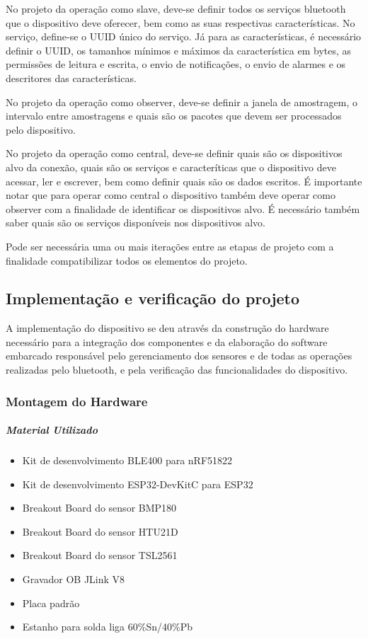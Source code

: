 No projeto da operação como slave, deve-se definir todos os serviços bluetooth
que o dispositivo deve oferecer, bem como as suas respectivas características. 
No serviço, define-se o UUID único do serviço. Já para as características, é
necessário definir o UUID, os tamanhos mínimos e máximos da característica em
bytes, as permissões de leitura e escrita, o envio de notificações, o envio de
alarmes e os descritores das características.

No projeto da operação como observer, deve-se definir a janela de
amostragem, o intervalo entre amostragens e quais são os pacotes que devem ser
processados pelo dispositivo.

No projeto da operação como central, deve-se definir quais são os dispositivos
alvo da conexão, quais são os serviços e caracteríticas que o dispositivo deve
acessar, ler e escrever, bem como definir quais são os dados escritos. É
importante notar que para operar como central o dispositivo também deve operar
como observer com a finalidade de identificar os dispositivos alvo. É
necessário também saber quais são os serviços disponíveis nos dispositivos alvo.

Pode ser necessária uma ou mais iterações entre as etapas de projeto com a
finalidade compatibilizar todos os elementos do projeto.

\subsection{Implementação e verificação do projeto}

A implementação do dispositivo se deu através da construção do hardware
necessário para a integração dos componentes e da elaboração do software
embarcado responsável pelo gerenciamento dos sensores e de todas as operações
realizadas pelo bluetooth, e pela verificação das funcionalidades do
dispositivo.

\subsubsection{Montagem do Hardware}
\subparagraph{Material Utilizado}

\begin{itemize}[noitemsep]
  \item Kit de desenvolvimento BLE400 para nRF51822
  \item Kit de desenvolvimento ESP32-DevKitC para ESP32
  \item Breakout Board do sensor BMP180
  \item Breakout Board do sensor HTU21D
  \item Breakout Board do sensor TSL2561
  \item Gravador OB JLink V8
  \item Placa padrão
  \item Estanho para solda liga 60\%Sn/40\%Pb
\end{itemize}

